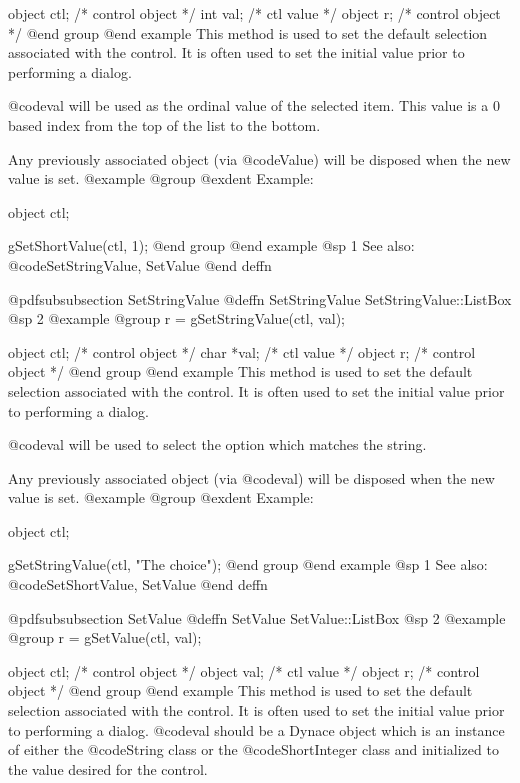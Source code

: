object  ctl;    /*  control object  */
int     val;    /*  ctl value       */
object  r;      /*  control object  */
@end group
@end example
This method is used to set the default selection associated with the
control.  It is often used to set the initial value prior to performing
a dialog.

@code{val} will be used as the ordinal value of the selected item.  This
value is a 0 based index from the top of the list to the bottom.

Any previously associated object (via @code{Value}) will be disposed
when the new value is set.
@example
@group
@exdent Example:

object  ctl;

gSetShortValue(ctl, 1);
@end group
@end example
@sp 1
See also:  @code{SetStringValue, SetValue}
@end deffn









@pdfsubsubsection {SetStringValue}
@deffn {SetStringValue} SetStringValue::ListBox
@sp 2
@example
@group
r = gSetStringValue(ctl, val);

object  ctl;    /*  control object  */
char    *val;   /*  ctl value       */
object  r;      /*  control object  */
@end group
@end example
This method is used to set the default selection associated with the
control.  It is often used to set the initial value prior to performing
a dialog.  

@code{val} will be used to select the option which matches the string.

Any previously associated object (via @code{val}) will be disposed when
the new value is set.  
@example
@group
@exdent Example:

object  ctl;

gSetStringValue(ctl, "The choice");
@end group
@end example
@sp 1
See also:  @code{SetShortValue, SetValue}
@end deffn










@pdfsubsubsection {SetValue}
@deffn {SetValue} SetValue::ListBox
@sp 2
@example
@group
r = gSetValue(ctl, val);

object  ctl;    /*  control object  */
object  val;    /*  ctl value       */
object  r;      /*  control object  */
@end group
@end example
This method is used to set the default selection associated with the
control.  It is often used to set the initial value prior to performing
a dialog.  @code{val} should be a Dynace object which is an instance of
either the @code{String} class or the @code{ShortInteger} class and
initialized to the value desired for the control.

